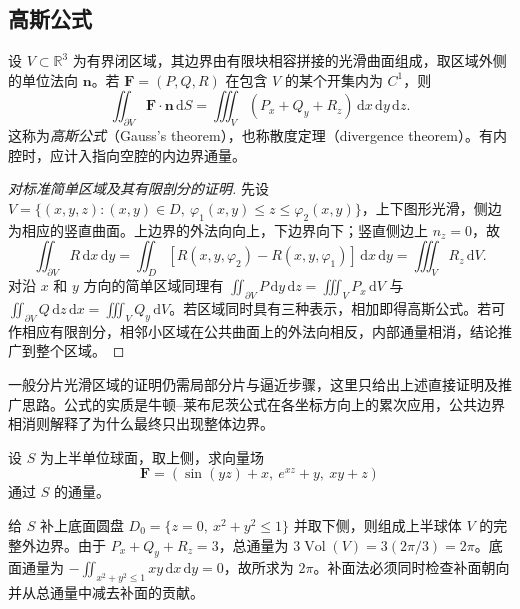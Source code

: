 \subsection{高斯公式}
\label{subsec:gauss-formula}

\begin{theorem}[高斯公式]
\label{thm:gauss-formula}
设 $V\subset\mathbb R^3$ 为有界闭区域，其边界由有限块相容拼接的光滑曲面组成，取区域外侧的单位法向 $\boldsymbol n$。若 $\boldsymbol F=(P,Q,R)$ 在包含 $V$ 的某个开集内为 $C^1$，则
\begin{equation}
\label{eq:gauss-formula}
    \iint_{\partial V}\boldsymbol F\cdot\boldsymbol n\,\mathrm dS
    =\iiint_V(P_x+Q_y+R_z)\,\mathrm dx\,\mathrm dy\,\mathrm dz.
\end{equation}
这称为\emph{高斯公式}（Gauss's theorem），也称散度定理（divergence theorem）。有内腔时，应计入指向空腔的内边界通量。
\end{theorem}

\begin{proof}[对标准简单区域及其有限剖分的证明]
先设 $V=\{(x,y,z):(x,y)\in D,\ \varphi_1(x,y)\leq z\leq\varphi_2(x,y)\}$，上下图形光滑，侧边为相应的竖直曲面。上边界的外法向向上，下边界向下；竖直侧边上 $n_z=0$，故
\[
    \iint_{\partial V}R\,\mathrm dx\,\mathrm dy
    =\iint_D[R(x,y,\varphi_2)-R(x,y,\varphi_1)]\,\mathrm dx\,\mathrm dy
    =\iiint_V R_z\,\mathrm dV.
\]
对沿 $x$ 和 $y$ 方向的简单区域同理有 $\iint_{\partial V}P\,\mathrm dy\,\mathrm dz=\iiint_VP_x\,\mathrm dV$ 与 $\iint_{\partial V}Q\,\mathrm dz\,\mathrm dx=\iiint_VQ_y\,\mathrm dV$。若区域同时具有三种表示，相加即得高斯公式。若可作相应有限剖分，相邻小区域在公共曲面上的外法向相反，内部通量相消，结论推广到整个区域。
\end{proof}

一般分片光滑区域的证明仍需局部分片与逼近步骤，这里只给出上述直接证明及推广思路。公式的实质是牛顿--莱布尼茨公式在各坐标方向上的累次应用，公共边界相消则解释了为什么最终只出现整体边界。

\begin{example}
\label{ex:gauss-close-hemisphere}
设 $S$ 为上半单位球面，取上侧，求向量场
\[
    \boldsymbol F=(\sin(yz)+x,\ e^{xz}+y,\ xy+z)
\]
通过 $S$ 的通量。
\end{example}
\begin{solve}
给 $S$ 补上底面圆盘 $D_0=\{z=0,\ x^2+y^2\leq1\}$ 并取下侧，则组成上半球体 $V$ 的完整外边界。由于 $P_x+Q_y+R_z=3$，总通量为 $3\operatorname{Vol}(V)=3(2\pi/3)=2\pi$。底面通量为 $-\iint_{x^2+y^2\leq1}xy\,\mathrm dx\,\mathrm dy=0$，故所求为 $2\pi$。补面法必须同时检查补面朝向并从总通量中减去补面的贡献。
\end{solve}

